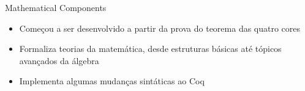 \begin{frame}{Mathematical Components}
    \begin{itemize}
        \item Começou a ser desenvolvido a partir da prova do teorema das quatro cores
        \item Formaliza teorias da matemática, desde estruturas básicas até tópicos avançados da álgebra \cite{assia_mahboubi_2022_7118596}
        \item Implementa algumas mudanças sintáticas ao Coq
    \end{itemize}
\end{frame}